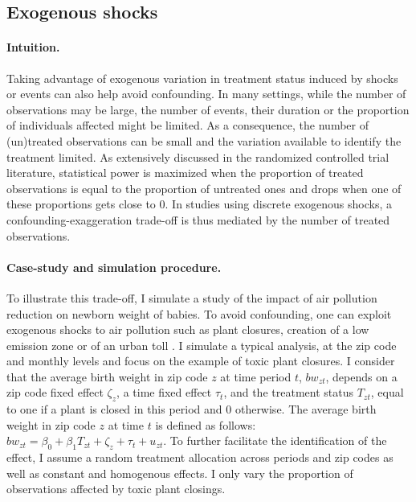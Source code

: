 \documentclass[usletter, 12pt]{article}
\begin{document}




		\subsection{Exogenous shocks}\label{sim_shocks}
    
        			\paragraph{Intuition.} Taking advantage of exogenous variation in treatment status induced by shocks or events can also help avoid confounding. In many settings, while the number of observations may be large, the number of events, their duration or the proportion of individuals affected might be limited. As a consequence, the number of (un)treated observations can be small and the variation available to identify the treatment limited. As extensively discussed in the randomized controlled trial literature, statistical power is maximized when the proportion of treated observations is equal to the proportion of untreated ones and drops when one of these proportions gets close to 0. In studies using discrete exogenous shocks, a confounding-exaggeration trade-off is thus mediated by the number of treated observations. %
			
			\paragraph{Case-study and simulation procedure.} %
			To illustrate this trade-off, I simulate a study of the impact of air pollution reduction on newborn weight of babies. To avoid confounding, one can exploit exogenous shocks to air pollution such as plant closures, creation of a low emission zone or of an urban toll \citep{currie_environmental_2015, lavaine_energy_2017}. I simulate a typical analysis, at the zip code and monthly levels and focus on the example of toxic plant closures. I consider that the average birth weight in zip code $z$ at time period $t$, $bw_{zt}$, depends on a zip code fixed effect $\zeta_z$, a time fixed effect $\tau_t$, and the treatment status $T_{zt}$, equal to one if a plant is closed in this period and 0 otherwise. The average birth weight in zip code $z$ at time $t$ is defined as follows: $bw_{zt} = \beta_0 + \beta_1 T_{zt} + \zeta_z + \tau_t + u_{zt}$. To further facilitate the identification of the effect, I assume a random treatment allocation across periods and zip codes as well as constant and homogenous effects. I only vary the proportion of observations affected by toxic plant closings.
\end{document}
